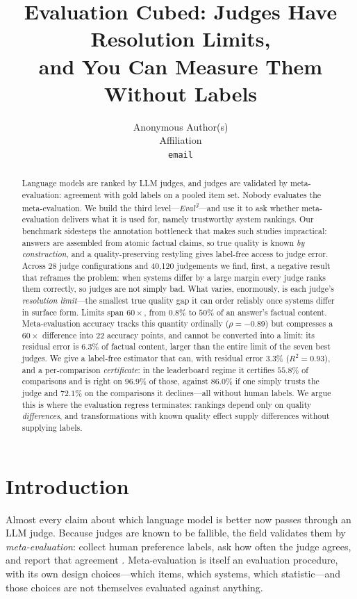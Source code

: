 \documentclass{article}
\title{Evaluation Cubed: Judges Have Resolution Limits,\\
and You Can Measure Them Without Labels}
\author{%
  Anonymous Author(s) \\
  Affiliation \\
  \texttt{email}
}
\theoremstyle{plain}
\theoremstyle{definition}
\begin{document}
\maketitle

\begin{abstract}
Language models are ranked by LLM judges, and judges are validated by meta-evaluation:
agreement with gold labels on a pooled item set. Nobody evaluates the meta-evaluation. We
build the third level---\emph{Eval\textsuperscript{3}}---and use it to ask whether
meta-evaluation delivers what it is used for, namely trustworthy system rankings. Our
benchmark sidesteps the annotation bottleneck that makes such studies impractical: answers
are assembled from atomic factual claims, so true quality is known \emph{by construction},
and a quality-preserving restyling gives label-free access to judge error. Across 28 judge
configurations and 40{,}120 judgements we find, first, a negative result that reframes the
problem: when systems differ by a large margin every judge ranks them correctly, so judges
are not simply bad. What varies, enormously, is each judge's \emph{resolution limit}---the
smallest true quality gap it can order reliably once systems differ in surface form. Limits
span $60\times$, from $0.8\%$ to $50\%$ of an answer's factual content. Meta-evaluation
accuracy tracks this quantity ordinally ($\rho=-0.89$) but compresses a $60\times$
difference into $22$ accuracy points, and cannot be converted into a limit: its residual
error is $6.3\%$ of factual content, larger than the entire limit of the seven best judges. We
give a label-free estimator that can, with residual error $3.3\%$ ($R^2=0.93$), and a
per-comparison \emph{certificate}: in the leaderboard regime it certifies $55.8\%$ of
comparisons and is right on $96.9\%$ of those, against $86.0\%$ if one simply trusts the judge
and $72.1\%$ on the comparisons it declines---all without human labels. We argue this is where the evaluation regress terminates: rankings
depend only on quality \emph{differences}, and transformations with known quality effect
supply differences without supplying labels.
\end{abstract}

\section{Introduction}

Almost every claim about which language model is better now passes through an LLM judge.
Because judges are known to be fallible, the field validates them by \emph{meta-evaluation}:
collect human preference labels, ask how often the judge agrees, and report that agreement
\citep{zheng2023judging,lambert2024rewardbench,tan2025judgebench}. Meta-evaluation is itself
an evaluation procedure, with its own design choices---which items, which systems, which
statistic---and those choices are not themselves evaluated against anything.
\end{document}
